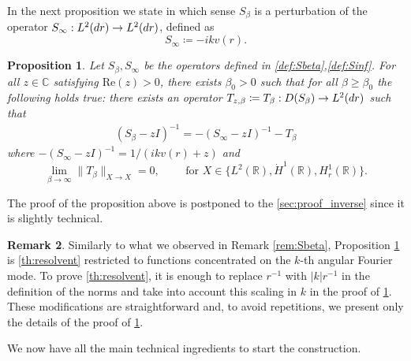 \documentclass[11pt,reqno]{amsproc}
\def\dd{{\rm d}}
\def\RR {\mathbb{R}}
\newtheorem{proposition}{Proposition}[section]
\theoremstyle{definition}
\newtheorem{remark}[proposition]{Remark}
\theoremstyle{definition}
\numberwithin{equation}{section}
\begin{document}
In the next proposition we state in which sense $S_\beta$ is a perturbation of the operator
$S_\infty: L^2(\dd r) \to L^2(\dd r)$, defined as
\begin{equation}
\label{def:Sinf}
S_\infty\coloneqq -ikv(r).
\end{equation}
\begin{proposition}
\label{prop:conv_Sbeta}
Let $S_\beta,S_\infty$ be the operators defined in \cref{def:Sbeta},\cref{def:Sinf}. For all $z\in \mathbb{C}$ satisfying $\mathrm{Re}(z)>0$, there exists $\beta_0>0$ such that for all $\beta\geq \beta_0$ the following holds true: there exists an operator $T_{z,\beta} \coloneqq T_\beta :D(S_\beta) \to L^2(\dd r)$ such that
\begin{align}
\label{eq:splitS_beta}
    (S_\beta-zI)^{-1}=-(S_\infty-zI)^{-1}-T_\beta
\end{align}
 where $-(S_\infty-zI)^{-1}=1/(ikv(r)+z)$ and
\begin{equation}
\lim_{\beta \rightarrow \infty} \|T_{\beta} \|_{X \to X} = 0, \qquad \text{ for } X\in \{L^2(\RR),\dot{H}^1(\RR),H^1_r(\RR)\}.
\end{equation}
\end{proposition}
The proof of the proposition above is postponed to the \cref{sec:proof_inverse} since it is slightly technical.

\begin{remark}
    Similarly to what we observed in Remark \ref{rem:Sbeta}, Proposition \ref{prop:conv_Sbeta} is  \cref{th:resolvent} restricted to functions concentrated on the $k$-th angular Fourier mode. To prove \cref{th:resolvent}, it is enough to replace  $r^{-1}$ with $|k|r^{-1}$ in the definition of the norms and take into account this scaling in $k$ in the proof of \cref{prop:conv_Sbeta}. These modifications are straightforward and, to avoid repetitions, we present only the details of the proof of \cref{prop:conv_Sbeta}.
\end{remark}
We now have all the main technical ingredients to start the construction.
\end{document}
